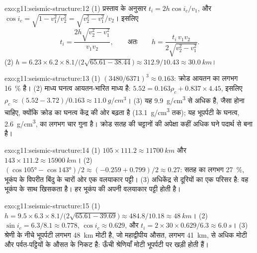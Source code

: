 \begin{solution}{exo:g11:seismic-structure:12}
(1) प्रस्ताव के अनुसार $t_i = 2h\cos i_c/v_1$, और $\cos i_c = \sqrt{1 -
v_1^2/v_2^2} = \sqrt{v_2^2 - v_1^2}/v_2$। इसलिए
\[
  t_i = \frac{2h\sqrt{v_2^2 - v_1^2}}{v_1 v_2},
  \qquad\text{अतः}\qquad
  h = \frac{t_i\,v_1 v_2}{2\sqrt{v_2^2 - v_1^2}}.
\]
(2) $h = 6.23 \times 6.2 \times 8.1/\bigl(2\sqrt{65.61 -
38.44}\bigr) \approx 312.9/10.43 \approx \qty{30.0}{km}$।
\end{solution}

\begin{solution}{exo:g11:seismic-structure:13}
(1) $(3480/6371)^3 \approx 0.163$: क्रोड आयतन का लगभग \qty{16}{\percent}
है। (2) माध्य घनत्व आयतन-भारित माध्य है: $5.52 = 0.163
\rho_c + 0.837 \times 4.45$, इसलिए $\rho_c \approx (5.52 - 3.72)/0.163 \approx
\qty{11.0}{g/cm^3}$। (3) यह \qty{9.9}{g/cm^3} से अधिक है, जैसा होना
चाहिए, क्योंकि क्रोड का घनत्व केंद्र की ओर बढ़ता है (\qty{13.1}{g/cm^3}
तक); यह भूपर्पटी के घनत्व, \qty{2.6}{g/cm^3}, का लगभग चार गुना है।
क्रोड सतह की चट्टानों की अपेक्षा कहीं अधिक घने पदार्थ से बना है।
\end{solution}

\begin{solution}{exo:g11:seismic-structure:14}
(1) $105 \times 111.2 \approx \qty{11700}{km}$ और $143 \times 111.2 \approx
\qty{15900}{km}$। (2) $(\cos\ang{105} - \cos\ang{143})/2 \approx (-0.259 +
0.799)/2 \approx 0.27$: सतह का लगभग \qty{27}{\percent}, भूकंप के विपरीत
बिंदु के चारों ओर एक वलयाकार पट्टी। (3)  अधिकेंद्र से दूरियों का एक
परिसर है: वह भूकंप के साथ खिसकता है। हर भूकंप की
अपनी वलयाकार पट्टी होती है।
\end{solution}

\begin{solution}{exo:g11:seismic-structure:15}
(1) $h = 9.5 \times 6.3 \times 8.1/\bigl(2\sqrt{65.61 - 39.69}\bigr) \approx
484.8/10.18 \approx \qty{48}{km}$। (2) $\sin i_c = 6.3/8.1 \approx 0.778$,
$\cos i_c \approx 0.629$, और $t_i = 2 \times 30 \times 0.629/6.3 \approx
\qty{6.0}{s}$। (3) श्रेणी के नीचे भूपर्पटी लगभग \qty{48}{km} मोटी है,
जो महाद्वीपीय औसत, लगभग \qty{41}{km}, से अधिक मोटी और पर्वत-पट्टियों के
औसत के निकट है: ऊँची श्रेणियाँ मोटी भूपर्पटी पर खड़ी होती हैं।
\end{solution}

